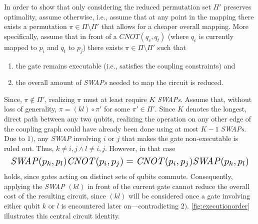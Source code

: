 \documentclass[10pt,conference]{IEEEtran}
\begin{document}
 In order to show that only considering the reduced permutation set $\Pi'$ preserves optimality, assume otherwise, i.e., assume that at any point in the mapping there exists a permutation $\pi\in\Pi\setminus \Pi'$ that allows for a cheaper overall mapping.
 More specifically, assume that in front of a $CNOT(q_c, q_t)$ (where $q_c$ is currently mapped to $p_i$ and $q_t$ to $p_j$) there exists $\pi \in \Pi \setminus \Pi'$ such that 
 \begin{enumerate}
 	\item the gate remains executable (i.e., satisfies the coupling constraints) and
 	\item the overall amount of \textit{SWAPs} needed to map the circuit is reduced.
 \end{enumerate}
 Since, $\pi\not\in\Pi'$, realizing $\pi$ must at least require $K$ \textit{SWAPs}.
 Assume that, without loss of generality,  $\pi = (kl)\circ \pi'$ for some $\pi'\in\Pi'$.
 Since $K$ denotes the longest, direct path between any two qubits, 
 realizing the operation on any other edge of the coupling graph could have already been done using at most $K-1$ \textit{SWAPs}.
 Due to $1)$, any \textit{SWAP} involving $i$ or $j$ that makes the gate non-executable is ruled out.
 Thus, $k \neq i, j \wedge l \neq i, j$.
 However, in that case 
 \[\resizebox{0.99\linewidth}{!}{$\mathit{SWAP}(p_k,p_l) \mathit{CNOT}(p_i,p_j) = \mathit{CNOT}(p_i,p_j) \mathit{SWAP}(p_k,p_l)$}\]
 holds, since gates acting on distinct sets of qubits commute. 
 Consequently, applying the \textit{SWAP} $(kl)$ in front of the current gate cannot reduce the overall cost of the resulting circuit, since $(kl)$ will be considered once a gate involving either qubit $k$ or $l$ is encountered later on---contradicting $2)$.
 \autoref{fig:executionorder} illustrates this central circuit identity.
 
\end{document}
